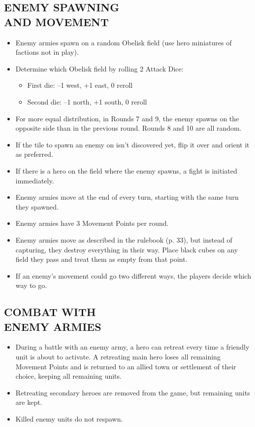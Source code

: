 \begin{multicols*}{2}

\subsection*{\MakeUppercase{Enemy Spawning\\and Movement}}

\begin{itemize}
  \item Enemy armies spawn on a random Obelisk field (use hero miniatures of factions not in play).
  \item Determine which Obelisk field by rolling 2 Attack Dice:
  \begin{itemize}
    \item First die: --1 west, +1 east, 0 reroll
    \item Second die: --1 north, +1 south, 0 reroll
  \end{itemize}
  \item For more equal distribution, in Rounds 7 and 9, the enemy spawns on the opposite side than in the previous round.
    Rounds 8 and 10 are all random.
  \item If the tile to spawn an enemy on isn't discovered yet, flip it over and orient it as preferred.
  \item If there is a hero on the field where the enemy spawns, a fight is initiated immediately.
  \item Enemy armies move at the end of every turn, starting with the same turn they spawned.
  \item Enemy armies have 3 Movement Points per round.
  \item Enemy armies move as described in the rulebook (p. 33), but instead of capturing, they destroy everything in their way.
    Place black cubes on any field they pass and treat them as empty from that point.
  \item If an enemy's movement could go two different ways, the players decide which way to go.
\end{itemize}


\subsection*{\MakeUppercase{Combat with\\Enemy Armies}}

\begin{itemize}
  \item During a battle with an enemy army, a hero can retreat every time a friendly unit is about to activate.
    A retreating main hero loses all remaining Movement Points and is returned to an allied town or settlement of their choice, keeping all remaining units.
  \item Retreating secondary heroes are removed from the game, but remaining units are kept.
  \item Killed enemy units do not respawn.
\end{itemize}


\end{multicols*}
